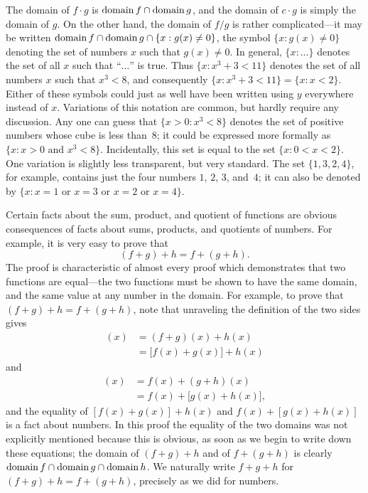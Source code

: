 The domain of $f \cdot g$ is $\operatorname{domain} f \cap \operatorname{domain} g$, and the domain of
$c \cdot g$ is simply the domain of $g$. On the other hand, the domain of
$f/g$ is rather complicated---it may be written
$\operatorname{domain} f \cap \operatorname{domain} g \cap \{x : g(x) \neq 0\}$, the symbol
$\{x : g(x) \neq 0\}$ denoting the set of numbers $x$ such that
$g(x) \neq 0$. In general, $\{x : \ldots\}$ denotes the set of all $x$ such
that ``$\ldots$'' is true. Thus $\{x : x^3 + 3 < 11\}$ denotes the set of all
numbers $x$ such that $x^3 < 8$, and consequently
$\{x : x^3 + 3 < 11\} = \{x : x < 2\}$. Either of these symbols could just as
well have been written using $y$ everywhere instead of $x$. Variations of this
notation are common, but hardly require any discussion. Any one can guess
that $\{x > 0 : x^3 < 8\}$ denotes the set of positive numbers whose cube is
less than~$8$; it could be expressed more formally as
$\{x : x > 0\text{ and }x^3 < 8\}$. Incidentally, this set is equal to the set
$\{x : 0 < x < 2\}$. One variation is slightly less transparent, but very
standard. The set $\{1, 3, 2, 4\}$, for example, contains just the four numbers
$1$, $2$, $3$, and~$4$; it can also be denoted by
$\{x : x = 1\text{ or }x = 3\text{ or }x = 2\text{ or }x = 4\}$.

Certain facts about the sum, product, and quotient of functions are obvious
consequences of facts about sums, products, and quotients of numbers. For
example, it is very easy to prove that
\[
(f+g)+h = f+(g+h).
\]
The proof is characteristic of almost every proof which demonstrates that two
functions are equal---the two functions must be shown to have the same domain,
and the same value at any number in the domain. For example, to prove that
$(f+g)+h = f+(g+h)$, note that unraveling the definition of the two sides
gives
\begin{align*}
[(f+g)+h](x)
&= (f+g)(x) + h(x)\\
&= \bigl[f(x) + g(x)\bigr] + h(x)
\end{align*}
and
\begin{align*}
[f+(g+h)](x)
&= f(x) + (g+h)(x)\\
&= f(x) + \bigl[g(x) + h(x)\bigr],
\end{align*}
and the equality of $[f(x)+g(x)]+h(x)$ and $f(x)+[g(x)+h(x)]$ is a fact about
numbers. In this proof the equality of the two domains was not explicitly
mentioned because this is obvious, as soon as we begin to write down these
equations; the domain of $(f+g)+h$ and of $f+(g+h)$ is clearly
$\operatorname{domain} f \cap \operatorname{domain} g \cap \operatorname{domain} h$. We naturally write $f+g+h$ for
$(f+g)+h = f+(g+h)$, precisely as we did for numbers.

